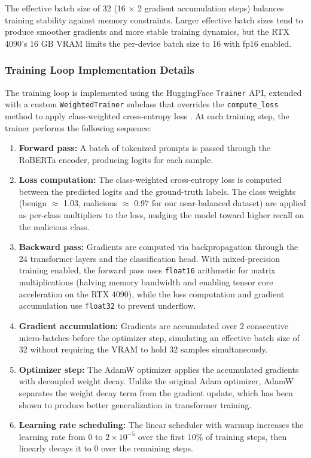 \documentclass[12pt, letterpaper]{article}   %
\begin{document}
The effective batch size of 32 (16 $\times$ 2 gradient accumulation steps) balances training stability against memory constraints. Larger effective batch sizes tend to produce smoother gradients and more stable training dynamics, but the RTX 4090's 16 GB VRAM limits the per-device batch size to 16 with fp16 enabled.

\subsubsection{Training Loop Implementation Details}

The training loop is implemented using the HuggingFace \texttt{Trainer} API, extended with a custom \texttt{WeightedTrainer} subclass that overrides the \texttt{compute\_loss} method to apply class-weighted cross-entropy loss \cite{ref37}\cite{ref38}. At each training step, the trainer performs the following sequence:

\begin{enumerate}
    \item \textbf{Forward pass:} A batch of tokenized prompts is passed through the RoBERTa encoder, producing logits for each sample.
    \item \textbf{Loss computation:} The class-weighted cross-entropy loss is computed between the predicted logits and the ground-truth labels. The class weights (benign $\approx$ 1.03, malicious $\approx$ 0.97 for our near-balanced dataset) are applied as per-class multipliers to the loss, nudging the model toward higher recall on the malicious class.
    \item \textbf{Backward pass:} Gradients are computed via backpropagation through the 24 transformer layers and the classification head. With mixed-precision training enabled, the forward pass uses \texttt{float16} arithmetic for matrix multiplications (halving memory bandwidth and enabling tensor core acceleration on the RTX 4090), while the loss computation and gradient accumulation use \texttt{float32} to prevent underflow.
    \item \textbf{Gradient accumulation:} Gradients are accumulated over 2 consecutive micro-batches before the optimizer step, simulating an effective batch size of 32 without requiring the VRAM to hold 32 samples simultaneously.
    \item \textbf{Optimizer step:} The AdamW optimizer applies the accumulated gradients with decoupled weight decay. Unlike the original Adam optimizer, AdamW separates the weight decay term from the gradient update, which has been shown to produce better generalization in transformer training.
    \item \textbf{Learning rate scheduling:} The linear scheduler with warmup increases the learning rate from 0 to $2 \times 10^{-5}$ over the first 10\% of training steps, then linearly decays it to 0 over the remaining steps.
\end{enumerate}
\end{document}

